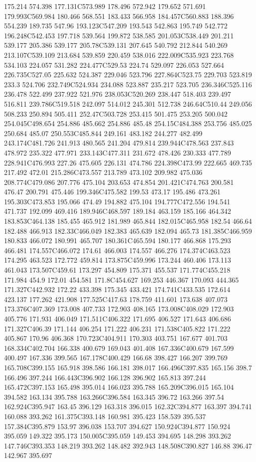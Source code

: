 175.214 574.398 177.131C573.989 178.496 572.942 179.652 571.691 179.993C569.984 180.466 568.551 183.433 566.958 184.457C560.883 188.396 554.239 189.735 547.96 193.123C547.209 193.543 542.863 195.749 542.772 196.248C542.453 197.718 539.564 199.872 538.585 201.053C538.449 201.211 539.177 205.386 539.177 205.78C539.131 207.645 540.792 212.844 540.269 213.107C539.109 213.684 539.859 220.459 538.016 222.009C535.923 223.768 534.103 224.057 531.282 224.477C529.53 224.74 529.097 226.053 527.664 226.735C527.05 225.632 524.387 229.046 523.796 227.864C523.75 229.703 523.819 233.3 524.706 232.749C524.934 234.088 523.887 235.217 523.705 236.346C525.116 236.478 522.499 237.922 521.976 238.053C520.269 238.447 518.403 239.497 516.811 239.786C519.518 242.097 514.012 245.301 512.738 246.64C510.44 249.056 508.233 250.894 505.411 252.47C503.728 253.415 501.475 253.205 500.042 254.045C498.654 254.886 485.662 254.886 485.48 254.15C484.388 253.756 485.025 250.684 485.07 250.553C485.844 249.161 483.182 244.277 482.499 243.174C481.726 241.913 480.565 241.204 479.814 239.944C478.563 237.843 478.972 235.322 477.971 233.143C477.311 231.672 478.426 230.333 477.789 228.941C476.993 227.26 475.605 226.131 474.786 224.398C473.99 222.665 469.735 217.492 472.01 215.286C473.557 213.789 473.102 209.982 475.036 208.774C479.086 207.776 475.104 203.653 474.854 201.421C474.763 200.581 476.47 200.791 475.446 199.346C475.582 199.53 473.17 195.486 473.261 195.303C473.853 195.066 474.49 194.882 475.104 194.777C472.556 194.541 471.737 192.099 469.416 189.946C468.597 189.184 463.159 185.166 464.342 183.853C464.138 185.455 465.912 181.989 465.844 182.015C465.958 182.54 466.64 182.488 466.913 182.33C466.049 182.383 465.639 182.094 465.73 181.385C466.959 180.833 466.072 180.991 465.707 180.361C465.594 180.177 466.868 175.293 466.481 174.557C466.072 174.61 466.003 174.557 466.276 174.374C463.523 174.295 463.523 172.772 459.814 173.875C459.996 173.244 460.406 173.113 461.043 173.507C459.61 173.297 454.809 175.371 455.537 171.774C455.218 171.984 454.9 172.01 454.581 171.8C454.627 169.253 446.367 170.093 444.365 171.327C442.932 172.22 433.398 175.345 433.421 174.741C433.535 172.614 423.137 177.262 421.908 177.525C417.63 178.759 411.601 173.638 407.073 173.376C407.369 173.008 407.733 172.903 408.165 173.008C408.029 172.903 405.776 171.931 406.049 171.511C406.322 171.695 406.527 171.643 406.686 171.327C406.39 171.144 406.254 171.222 406.231 171.538C405.822 171.222 405.867 170.96 406.368 170.723C404.911 170.303 403.751 167.677 401.703 168.334C402.704 166.338 400.679 169.043 401.408 167.336C400.679 167.599 400.497 167.336 399.565 167.178C400.429 166.68 398.427 166.207 399.769 165.708C399.155 165.918 398.586 166.181 398.017 166.496C397.835 165.156 398.7 166.496 397.244 166.443C396.902 166.128 396.902 165.813 397.244 165.472C397.153 165.498 395.014 166.023 395.788 165.209C396.015 165.104 394.582 163.134 395.788 163.266C396.584 163.345 396.72 163.266 397.54 162.924C395.947 163.45 396.129 163.318 396.015 162.32C394.877 163.397 394.741 160.088 393.262 161.375C393.148 160.981 395.423 158.539 395.537 157.384C395.879 153.97 396.038 153.707 394.627 150.924C394.877 150.924 395.059 149.322 395.173 150.005C395.059 149.453 394.695 148.298 393.262 147.746C393.353 148.219 393.262 148.482 392.943 148.508C390.827 146.88 396.47 142.967 395.697 